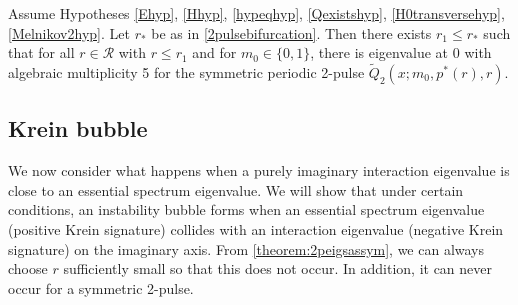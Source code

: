 \documentclass[thesis.tex]{subfiles}
\begin{document}
\begin{theorem}\label{theorem:2peigssym}
Assume Hypotheses \ref{Ehyp}, \ref{Hhyp}, \ref{hypeqhyp}, \ref{Qexistshyp}, \ref{H0transversehyp}, \ref{Melnikov2hyp}. Let $r_*$ be as in \cref{2pulsebifurcation}. Then there exists $r_1 \leq r_*$ such that for all $r \in \mathcal{R}$ with $r \leq r_1$ and for $m_0 \in \{0, 1\}$, there is eigenvalue at 0 with algebraic multiplicity 5 for the symmetric periodic 2-pulse $\tilde{Q}_2(x; m_0, p^*(r), r)$.
\end{theorem}

\subsection{Krein bubble}

We now consider what happens when a purely imaginary interaction eigenvalue is close to an essential spectrum eigenvalue. We will show that under certain conditions, an instability bubble forms when an essential spectrum eigenvalue (positive Krein signature) collides with an interaction eigenvalue (negative Krein signature) on the imaginary axis. From \cref{theorem:2peigsassym}, we can always choose $r$ sufficiently small so that this does not occur. In addition, it can never occur for a symmetric 2-pulse. 
\end{document}
